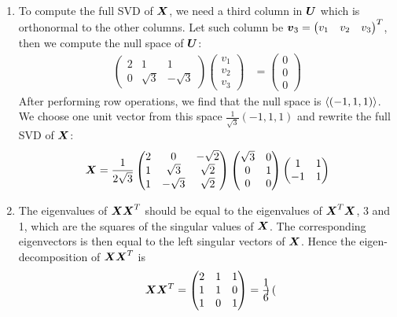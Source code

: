 \documentclass{report}
\begin{document}
\begin{enumerate}
		\item To compute the full SVD of $\bmX$, we need a third column in $\bmU$ which is orthonormal to the other columns. Let such column be $\bmv_3=\begin{pmatrix}
		v_1 & v_2 & v_3
		\end{pmatrix}^T$, then we compute the null space of $\bmU$:
		\begin{align*}
			\begin{pmatrix}
				2 & 1 & 1 \\ 0 & \sqrt{3} & -\sqrt{3}
			\end{pmatrix}\begin{pmatrix}
			v_1 \\ v_2 \\ v_3
			\end{pmatrix}&=\begin{pmatrix}
			0 \\ 0 \\ 0
			\end{pmatrix}
		\end{align*}
		After performing row operations, we find that the null space is $\lsp(-1,1,1)\rsp$. We choose one unit vector from this space $\frac{1}{\sqrt{3}}(-1,1,1)$ and rewrite the full SVD of $\bmX$:
		$$\bmX=\frac{1}{2\sqrt{3}}\begin{pmatrix}
			2 & 0 & -\sqrt{2} \\ 1 & \sqrt{3} & \sqrt{2} \\ 1 & -\sqrt{3} & \sqrt{2} 
		\end{pmatrix}\begin{pmatrix}
		\sqrt{3} & 0 \\ 0 & 1 \\ 0 & 0
		\end{pmatrix}\begin{pmatrix}
		1 & 1 \\ -1 & 1
		\end{pmatrix}$$
		\item The eigenvalues of $\bmX\bmX^T$ should be equal to the eigenvalues of $\bmX^T\bmX$, 3 and 1, which are the squares of the singular values of $\bmX$. The corresponding eigenvectors is then equal to the left singular vectors of $\bmX$. Hence the eigen-decomposition of $\bmX\bmX^T$ is
		$$\bmX\bmX^T=\begin{pmatrix}
			2 & 1 & 1 \\ 1 & 1 & 0 \\ 1 & 0 & 1
		\end{pmatrix}=\frac{1}{6}\begin{pmatrix}

\end{pmatrix}$$
\end{enumerate}
\end{document}

